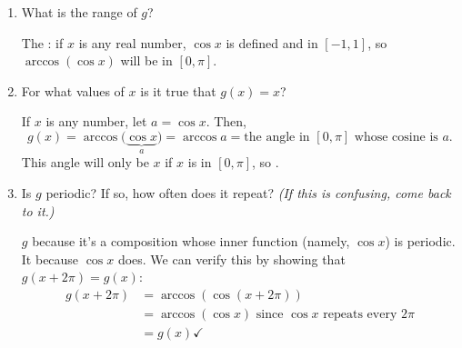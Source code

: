 \documentclass[main]{subfiles}
\begin{document}
\begin{enumerate}[resume]
\begin{enumerate}[topsep=0pt]
    \item
      \begin{problem}[0.25in]
        What is the range of $g$?
      \end{problem}

      \begin{solution}
      The : if $x$ is any real
      number, $\cos x$ is defined and in $[-1, 1]$, so $\arccos(\cos x)$
      will be in $[0,\pi]$.
      \end{solution}

  \item
    \begin{problem}[1in]
      For what values of $x$ is it true that $g(x) = x$?
    \end{problem}

    \begin{solution}
      If $x$ is any number, let $a = \cos x$.  Then, \[ g(x) = \arccos
      \Big( \underbrace{\cos x}_a \Big) = \arccos a = \text{the angle in
        $[0, \pi]$ whose cosine is $a$}.\] This angle will only be $x$ if
      $x$ is in $[0, \pi]$, so .
    \end{solution}

  \item


    \begin{problem}[0.5in]
      Is $g$ periodic?  If so, how often does it repeat?
      \emph{(If this is confusing, come back to it.)}
    \end{problem}

    \begin{solution}
      $g$  because it's a composition whose inner
      function (namely, $\cos x$) is periodic.  It  because $\cos x$ does.  We can verify this by showing
      that $g(x + 2 \pi) = g(x)$:
      \begin{align*}
        g(x + 2\pi) &= \arccos (\cos (x + 2\pi)) \\
        &= \arccos(\cos x) \text{ since $\cos x$ repeats every $2\pi$} \\
        &= g(x) \checkmark
      \end{align*}
    \end{solution}
    


\end{enumerate}
\end{enumerate}
\end{document}
